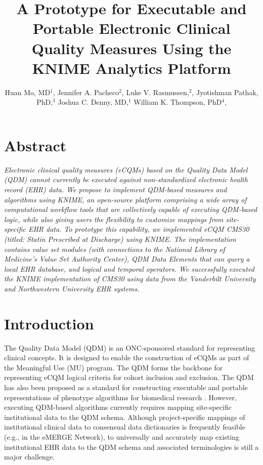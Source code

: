 \documentclass{article}
\begin{document}
\title{A Prototype for Executable and Portable Electronic Clinical Quality Measures Using the KNIME Analytics Platform}


\author{
Huan Mo, MD$^1$,
Jennifer A. Pacheco$^2$,
Luke V. Rasmussen,$^2$,
Jyotishman Pathak, PhD,$^3$
Joshua C. Denny, MD,$^1$
William K. Thompson, PhD$^4$,
}


\maketitle

\section*{Abstract}
\textit{Electronic clinical quality measures (eCQMs) based on the Quality Data Model (QDM) cannot currently be executed against non-standardized electronic health record (EHR) data. We propose to implement QDM-based measures and algorithms using KNIME, an open-source platform comprising a wide array of computational workflow tools that are collectively capable of executing QDM-based logic, while also giving users the flexibility to customize mappings from site-specific EHR data. To prototype this capability, we implemented eCQM CMS30 (titled: Statin Prescribed at Discharge) using KNIME. The implementation contains value set modules (with connections to the National Library of Medicine's Value Set Authority Center), QDM Data Elements that can query a local EHR database, and logical and temporal operators. We successfully executed the KNIME implementation of CMS30 using data from the Vanderbilt University and Northwestern University EHR systems.
}

\section{Introduction}

The Quality Data Model (QDM) is an ONC-sponsored standard for representing clinical concepts\cite{_quality_2014}. It is designed to enable the construction of eCQMs as part of the Meaningful Use (MU) program. The QDM forms the backbone for representing eCQM logical criteria for cohort inclusion and exclusion. The QDM has also been proposed as a standard for constructing executable and portable representations of phenotype algorithms for biomedical research \cite{thompson_evaluation_2012}. However, executing QDM-based algorithms currently requires mapping site-specific institutional data to the QDM schema. Although project-specific mappings of institutional clinical data to consensual data dictionaries is frequently feasible (e.g., in the eMERGE Network\cite{kho_electronic_2011}), to universally and accurately map existing institutional EHR data to the QDM schema and associated terminologies is still a major challenge.
\end{document}
